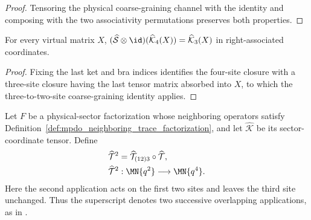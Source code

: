 \begin{proof}\leanok
    Tensoring the physical coarse-graining channel with the identity and
    composing with the two associativity permutations preserves both
    properties.
\end{proof}

\begin{lemma}
    \label{thm:mpdo_localized_physical_s_closure_identity}
    \leanok
    For every virtual matrix $X$,
    $(\widehat{\mathcal S}\otimes\id)
        (\widehat{\mathcal K}_4(X))
        =\widehat{\mathcal K}_3(X)$ in right-associated coordinates.
\end{lemma}

\begin{proof}\leanok
    Fixing the last ket and bra indices identifies the four-site closure with
    a three-site closure having the last tensor matrix absorbed into $X$, to
    which the three-to-two-site coarse-graining identity applies.
\end{proof}

\begin{definition}
    \label{def:mpdo_physical_t_squared_map}
    \leanok
    Let $F$ be a physical-sector factorization whose neighboring operators
    satisfy Definition~\ref{def:mpdo_neighboring_trace_factorization}, and let
    $\widehat{\mathcal K}$ be its sector-coordinate tensor. Define
    \begin{align}
        \widehat{\mathcal T}^2
         & =\widehat{\mathcal T}_{(12)3}\circ\widehat{\mathcal T},
        \notag                                                     \\
        \widehat{\mathcal T}^2
         & :\MN{q^2}\longrightarrow\MN{q^4}.
        \notag
    \end{align}
    Here the second application acts on the first two sites and leaves the
    third site unchanged. Thus the superscript denotes two successive
    overlapping applications, as in
    \cite[Appendix~C.2, lines~1821--1825]{Cirac2016MPDO_arXiv}.
\end{definition}

